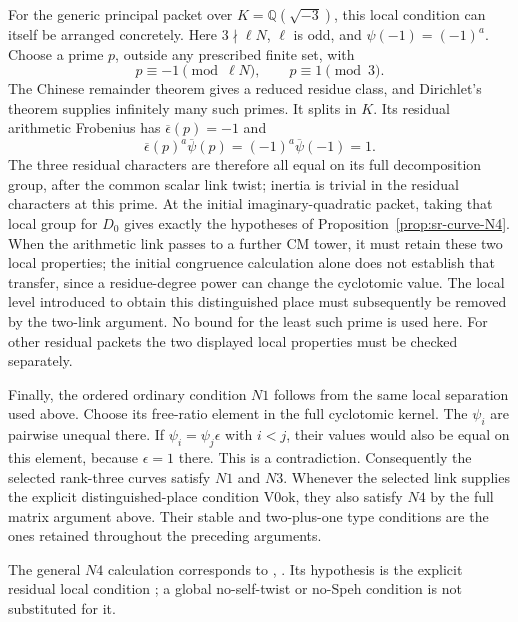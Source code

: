 For the generic principal packet over
\(K=\mathbb Q(\sqrt{-3})\), this local condition can itself
be arranged concretely.
Here \(3\nmid\ell N\), \(\ell\) is odd, and
\(\psi(-1)=(-1)^a\).
Choose a prime \(p\), outside any prescribed finite set, with
\[
                       p\equiv-1\pmod{\ell N},
                       \qquad p\equiv1\pmod3.
\]
The Chinese remainder theorem gives a reduced residue
class, and Dirichlet's theorem supplies infinitely many
such primes.
It splits in \(K\).
Its residual arithmetic Frobenius has
\(\overline\epsilon(p)=-1\) and
\[
           \overline\epsilon(p)^a\overline\psi(p)
                     =(-1)^a\overline\psi(-1)=1.
\]
The three residual characters are therefore all equal
on its full decomposition group, after the common scalar
link twist; inertia is trivial in the residual characters
at this prime.
At the initial imaginary-quadratic packet, taking that local
group for \(D_0\) gives exactly the hypotheses of
Proposition~\ref{prop:sr-curve-N4}.  When the arithmetic link
passes to a further CM tower, it must retain these two
local properties; the initial congruence calculation alone
does not establish that transfer, since a residue-degree
power can change the cyclotomic value.
The local level introduced to obtain this distinguished
place must subsequently be removed by the two-link argument.
No bound for the least such prime is used here.
For other residual packets the two displayed local
properties must be checked separately.

Finally, the ordered ordinary condition \(N1\) follows from
the same local separation used above.
Choose its free-ratio element in the full cyclotomic kernel.
The \(\psi_i\) are pairwise unequal there.
If \(\psi_i=\psi_j\epsilon\) with \(i<j\), their values
would also be equal on this element, because
\(\epsilon=1\) there.  This is a contradiction.
Consequently the selected rank-three curves satisfy \(N1\)
and \(N3\).  Whenever the selected link supplies the
explicit distinguished-place condition \(\mathrm{V0ok}\),
they also satisfy \(N4\) by the full matrix argument above. Their stable and two-plus-one type conditions are
the ones retained throughout the preceding arguments.

The general \(N4\) calculation corresponds to
,
.  Its hypothesis is the explicit residual
local condition ; a global no-self-twist or
no-Speh condition is not substituted for it.
